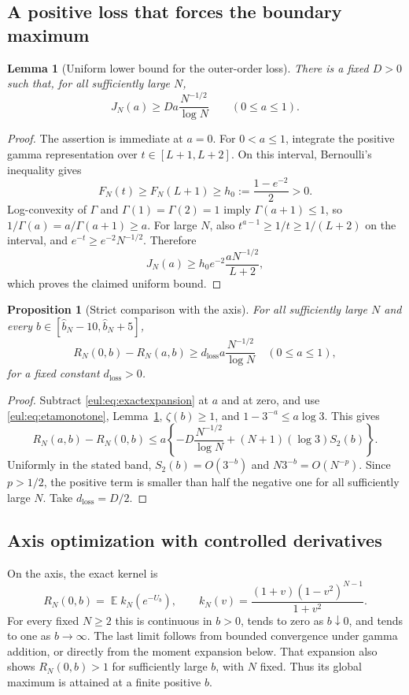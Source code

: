 \documentclass[11pt]{article}
\numberwithin{equation}{section}
\newtheorem{lemma}[theorem]{Lemma}
\newtheorem{proposition}[theorem]{Proposition}
\theoremstyle{definition}
\theoremstyle{remark}
\DeclareMathOperator{\E}{\mathbb E}
\begin{document}
\subsection{A positive loss that forces the boundary maximum}
\begin{lemma}[Uniform lower bound for the outer-order loss]\label{eul:lem:slope}
There is a fixed $D>0$ such that, for all sufficiently large $N$,
\[
 J_N(a)\geq D a\frac{N^{-1/2}}{\log N}
 \qquad(0\leq a\leq1).
\]
\end{lemma}
\begin{proof}
The assertion is immediate at $a=0$.  For $0<a\leq1$, integrate the
positive gamma representation over $t\in[L+1,L+2]$.
On this interval, Bernoulli's inequality gives
\[
 F_N(t)\geq F_N(L+1)\geq h_0:=\frac{1-e^{-2}}2>0.
\]
Log-convexity of $\Gamma$ and $\Gamma(1)=\Gamma(2)=1$ imply
$\Gamma(a+1)\leq1$, so $1/\Gamma(a)=a/\Gamma(a+1)\geq a$.
For large $N$, also $t^{a-1}\geq1/t\geq1/(L+2)$ on the interval,
and $e^{-t}\geq e^{-2}N^{-1/2}$.  Therefore
\[
 J_N(a)\geq h_0e^{-2}\frac{aN^{-1/2}}{L+2},
\]
which proves the claimed uniform bound.
\end{proof}

\begin{proposition}[Strict comparison with the axis]\label{eul:prop:decrease}
For all sufficiently large $N$ and every
$b\in[\widehat b_N-10,\widehat b_N+5]$,
\begin{equation}\label{eul:eq:gap-a}
 R_N(0,b)-R_N(a,b)
 \geq d_{\mathrm{loss}} a\frac{N^{-1/2}}{\log N}
 \quad(0\leq a\leq1),
\end{equation}
for a fixed constant $d_{\mathrm{loss}}>0$.
\end{proposition}
\begin{proof}
Subtract \eqref{eul:eq:exactexpansion} at $a$ and at zero, and use
\eqref{eul:eq:etamonotone}, Lemma~\ref{eul:lem:slope}, $\zeta(b)\geq1$, and
$1-3^{-a}\leq a\log3$.  This gives
\[
 R_N(a,b)-R_N(0,b)
 \leq a\left\{
 -D\frac{N^{-1/2}}{\log N}+(N+1)(\log3)S_2(b)\right\}.
\]
Uniformly in the stated band,
$S_2(b)=O(3^{-b})$ and $N3^{-b}=O(N^{-p})$.
Since $p>1/2$, the positive term is smaller than half the negative
one for all sufficiently large $N$.  Take $d_{\mathrm{loss}}=D/2$.
\end{proof}

\subsection{Axis optimization with controlled derivatives}
On the axis, the exact kernel is
\[
 R_N(0,b)=\E k_N(e^{-U_b}),\qquad
 k_N(v)=\frac{(1+v)(1-v^2)^{N-1}}{1+v^2}.
\]
For every fixed $N\geq2$ this is continuous in $b>0$, tends to zero
as $b\downarrow0$, and tends to one as $b\to\infty$.
The last limit follows from bounded convergence under gamma addition,
or directly from the moment expansion below.  That expansion also
shows $R_N(0,b)>1$ for sufficiently large $b$, with $N$ fixed.
Thus its global maximum is attained at a finite positive $b$.
\end{document}
